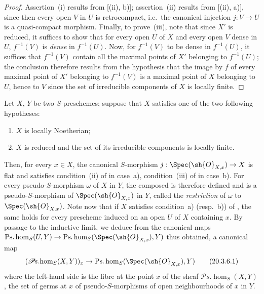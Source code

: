 \begin{proof}
Assertion~(i) results from [(ii), b)];
assertion~(ii) results from [(ii), a)], since then every open $V$ in $U$ is retrocompact, i.e.\ the canonical injection $j:V\to U$ is a quasi-compact morphism.
Finally, to prove~(iii), note that since $X'$ is reduced, it suffices to show that for every open $U$ of $X$ and every open $V$ dense in $U$, $f^{-1}(V)$ is \emph{dense} in $f^{-1}(U)$.
Now, for $f^{-1}(V)$ to be dense in $f^{-1}(U)$, it suffices that $f^{-1}(V)$ contain all the maximal points of $X'$ belonging to $f^{-1}(U)$;
the conclusion therefore results from the hypothesis that the image by $f$ of every maximal point of $X'$ belonging to $f^{-1}(V)$ is a maximal point of $X$ belonging to $U$, hence to $V$ since the set of irreducible components of $X$ is locally finite.
\end{proof}

\begin{env}[20.3.6]
\label{IV.20.3.6}
Let $X$, $Y$ be two $S$-preschemes;
suppose that $X$ satisfies one of the two following hypotheses:
\begin{enumerate}[label=\emph{\alph*)}]
  \item $X$ is locally Noetherian;
  \item $X$ is reduced and the set of its irreducible components is locally finite.
\end{enumerate}
Then, for every $x\in X$, the canonical $S$-morphism $j:\Spec(\sh{O}_{X,x})\to X$ is flat and satisfies condition~(ii) of  in case~a), condition~(iii) of  in case~b).
For every pseudo-$S$-morphism $\omega$ of $X$ in $Y$, the composed is therefore defined and is a pseudo-$S$-morphism of $\Spec(\sh{O}_{X,x})$ in $Y$, called the \emph{restriction} of $\omega$ to $\Spec(\sh{O}_{X,x})$.
Note now that if $X$ satisfies condition~a) (resp.~b)) of , the same holds for every prescheme induced on an open $U$ of $X$ containing $x$.
By passage to the inductive limit, we deduce from the canonical maps $\operatorname{Ps.hom}_S(U,Y)\to\operatorname{Ps.hom}_S(\Spec(\sh{O}_{X,x}),Y)$ thus obtained, a canonical map
\[
\label{IV.20.3.6.1}
  (\mathscr{P}\!s.\!\operatorname{hom}_S(X,Y))_x\to\operatorname{Ps.hom}_S(\Spec(\sh{O}_{X,x}),Y)
  \tag{20.3.6.1}
\]
where the left-hand side is the fibre at the point $x$ of the sheaf $\mathscr{P}\!s.\!\operatorname{hom}_S(X,Y)$, the set of germs at $x$ of pseudo-$S$-morphisms of open neighbourhoods of $x$ in $Y$.
\end{env}

